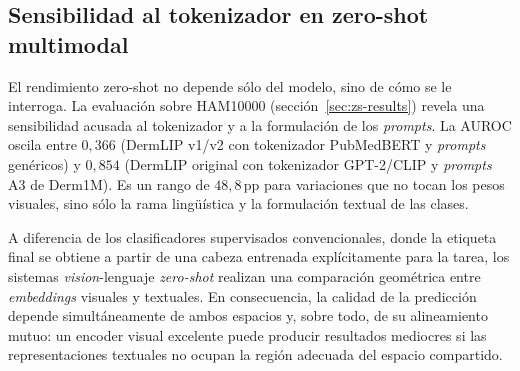 \subsection{Sensibilidad al tokenizador en zero-shot multimodal}
\label{sec:disc-zs}

El rendimiento zero-shot no depende sólo del modelo, sino de cómo se
le interroga. La evaluación sobre HAM10000
(sección~\ref{sec:zs-results}) revela una
sensibilidad acusada al tokenizador y a la formulación de los
\emph{prompts}. La AUROC oscila entre $0{,}366$ (DermLIP v1/v2 con
tokenizador PubMedBERT y \emph{prompts} genéricos) y $0{,}854$
(DermLIP original con tokenizador GPT-2/CLIP y \emph{prompts} A3 de
Derm1M). Es un rango de $48{,}8$\,pp para variaciones que no tocan
los pesos visuales, sino sólo la rama lingüística y la formulación
textual de las clases.

A diferencia de los clasificadores supervisados convencionales, donde
la etiqueta final se obtiene a partir de una cabeza entrenada
explícitamente para la tarea, los sistemas \emph{vision}-lenguaje
\emph{zero-shot} realizan una comparación geométrica entre
\emph{embeddings} visuales y textuales. En consecuencia, la calidad de
la predicción depende simultáneamente de ambos espacios y, sobre todo,
de su alineamiento mutuo: un encoder visual excelente puede producir
resultados mediocres si las representaciones textuales no ocupan la
región adecuada del espacio compartido.

